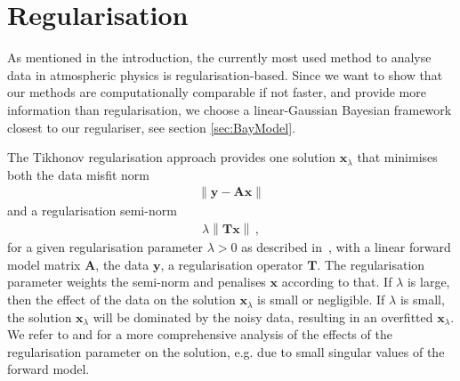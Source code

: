 \section{Regularisation}
\label{sec:regularise}
As mentioned in the introduction, the currently most used method to analyse data in atmospheric physics is regularisation-based.
Since we want to show that our methods are computationally comparable if not faster, and provide more information than regularisation, we choose a linear-Gaussian Bayesian framework closest to our regulariser, see section \ref{sec:BayModel}.

The Tikhonov regularisation approach provides one solution $\bm{x}_{\lambda}$ that minimises both the data misfit norm
\begin{align}
	\left\lVert \bm{y} - \bm{A} \bm{x} \right\rVert
\end{align} and a regularisation semi-norm
\begin{align}
	\lambda \left\lVert \bm{T} \bm{x} \right\rVert \, , \label{semiNorm}
\end{align}
for a given regularisation parameter $\lambda > 0 $ as described in~\cite{fox2016fast}, with a linear forward model matrix $\bm{A}$, the data $\bm{y}$, a regularisation operator $\bm{T}$.
The regularisation parameter weights the semi-norm and penalises $\bm{x}$ according to that.
If $\lambda$ is large, then the effect of the data on the solution $\bm{x}_{\lambda}$ is small or negligible.
If $\lambda$ is small, the solution $\bm{x}_{\lambda}$ will be dominated by the noisy data, resulting in an overfitted $\bm{x}_{\lambda}$.
We refer to  \cite{hansen1989GSVD} and \cite{tan2016LecNot} for a more comprehensive analysis of the effects of the regularisation parameter on the solution, e.g. due to small singular values of the forward model.

